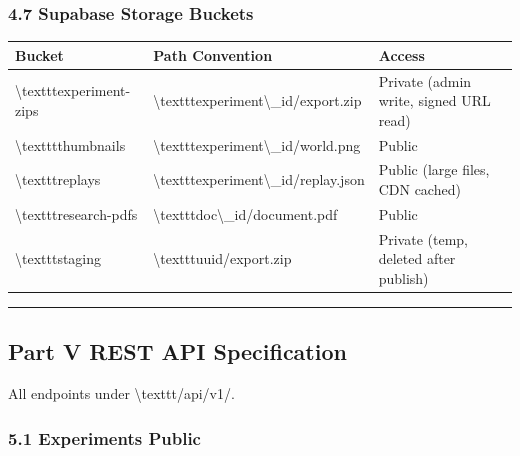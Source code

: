 \documentclass[11pt,a4paper]{article}
\begin{document}
\subsubsection*{4.7 Supabase Storage Buckets}

\begin{longtable}{lll}
\toprule
Bucket & Path Convention & Access \\
\midrule
\endhead
\textbackslash{}texttt{experiment-zips} & \textbackslash{}texttt{{experiment\textbackslash{}\_id}/export.zip} & Private (admin write, signed URL read) \\
\textbackslash{}texttt{thumbnails} & \textbackslash{}texttt{{experiment\textbackslash{}\_id}/world.png} & Public \\
\textbackslash{}texttt{replays} & \textbackslash{}texttt{{experiment\textbackslash{}\_id}/replay.json} & Public (large files, CDN cached) \\
\textbackslash{}texttt{research-pdfs} & \textbackslash{}texttt{{doc\textbackslash{}\_id}/document.pdf} & Public \\
\textbackslash{}texttt{staging} & \textbackslash{}texttt{{uuid}/export.zip} & Private (temp, deleted after publish) \\
\bottomrule
\end{longtable}

\noindent\rule{\textwidth}{0.4pt}

\subsection*{Part V  REST API Specification}

All endpoints under \textbackslash{}texttt{/api/v1/}.

\subsubsection*{5.1 Experiments  Public}
\end{document}
